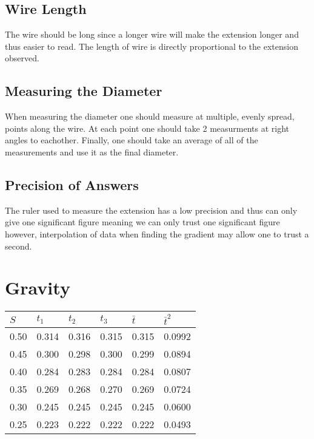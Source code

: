\documentclass{article}
\begin{document}
\subsection{Wire Length}
The wire should be long since a longer wire will make the extension longer
and thus easier to read. The length of wire is directly proportional to the
extension observed.

\subsection{Measuring the Diameter}
When measuring the diameter one should measure at multiple, evenly spread, points along the wire.
At each point one should take 2 measurments at right angles to eachother. Finally, one should
take an average of all of the measurements and use it as the final diameter.

\subsection{Precision of Answers}
The ruler used to measure the extension has a low precision and thus
can only give one significant figure meaning we can only trust one
significant figure however, interpolation of data when finding
the gradient may allow one to trust a second.

\section{Gravity}

\begin{center}
    \begin{tabular}{l|l|l|l|l|l}
     $S$ & $t_1$ & $t_2$ & $t_3$ & $\bar{t}$ & ${\bar{t}}^2$\\ \hline
     0.50 & 0.314 & 0.316 & 0.315 & 0.315 & 0.0992 \\
     0.45 & 0.300 & 0.298 & 0.300 & 0.299 & 0.0894 \\
     0.40 & 0.284 & 0.283 & 0.284 & 0.284 & 0.0807 \\
     0.35 & 0.269 & 0.268 & 0.270 & 0.269 & 0.0724 \\
     0.30 & 0.245 & 0.245 & 0.245 & 0.245 & 0.0600 \\
     0.25 & 0.223 & 0.222 & 0.222 & 0.222 & 0.0493 \\
    \end{tabular}
\end{center}

\begin{center}

\end{center}
\end{document}
